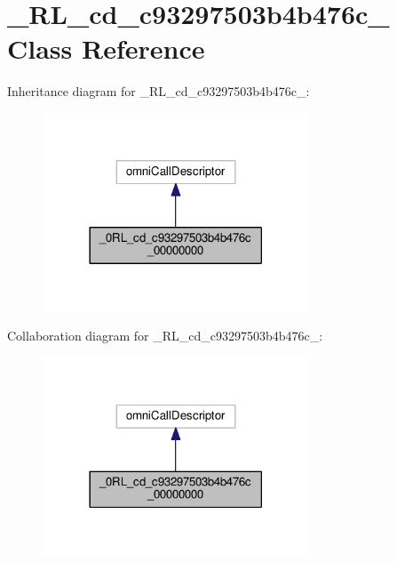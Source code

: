 \hypertarget{class__0_r_l__cd__c93297503b4b476c__00000000}{}\section{\+\_\+R\+L\+\_\+cd\+\_\+c93297503b4b476c\+\_ Class Reference}
\label{class__0_r_l__cd__c93297503b4b476c__00000000}


Inheritance diagram for \+\_\+R\+L\+\_\+cd\+\_\+c93297503b4b476c\+\_\+:
\nopagebreak
\begin{figure}[H]
\begin{center}
\leavevmode
\includegraphics[width=225pt]{class__0_r_l__cd__c93297503b4b476c__00000000__inherit__graph}
\end{center}
\end{figure}


Collaboration diagram for \+\_\+R\+L\+\_\+cd\+\_\+c93297503b4b476c\+\_\+:
\nopagebreak
\begin{figure}[H]
\begin{center}
\leavevmode
\includegraphics[width=225pt]{class__0_r_l__cd__c93297503b4b476c__00000000__coll__graph}
\end{center}
\end{figure}
